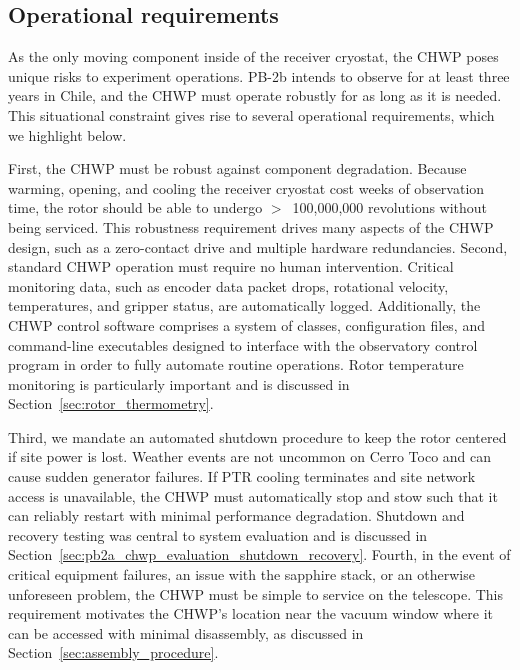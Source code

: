 
\subsection{Operational requirements}
\label{sec:operational_requirements}

As the only moving component inside of the receiver cryostat, the CHWP poses unique risks to experiment operations. PB-2b intends to observe for at least three years in Chile, and the CHWP must operate robustly for as long as it is needed. This situational constraint gives rise to several operational requirements, which we highlight below.

First, the CHWP must be robust against component degradation. Because warming, opening, and cooling the receiver cryostat cost weeks of observation time, the rotor should be able to undergo $>$~100,000,000 revolutions without being serviced. This robustness requirement drives many aspects of the CHWP design, such as a zero-contact drive and multiple hardware redundancies. Second, standard CHWP operation must require no human intervention. Critical monitoring data, such as encoder data packet drops, rotational velocity, temperatures, and gripper status, are automatically logged. Additionally, the CHWP control software comprises a system of classes, configuration files, and command-line executables designed to interface with the observatory control program in order to fully automate routine operations. Rotor temperature monitoring is particularly important and is discussed in Section~\ref{sec:rotor_thermometry}.

Third, we mandate an automated shutdown procedure to keep the rotor centered if site power is lost. Weather events are not uncommon on Cerro Toco and can cause sudden generator failures. If PTR cooling terminates and site network access is unavailable, the CHWP must automatically stop and stow such that it can reliably restart with minimal performance degradation. Shutdown and recovery testing was central to system evaluation and is discussed in Section~\ref{sec:pb2a_chwp_evaluation_shutdown_recovery}. Fourth, in the event of critical equipment failures, an issue with the sapphire stack, or an otherwise unforeseen problem, the CHWP must be simple to service on the telescope. This requirement motivates the CHWP's location near the vacuum window where it can be accessed with minimal disassembly, as discussed in Section~\ref{sec:assembly_procedure}.

